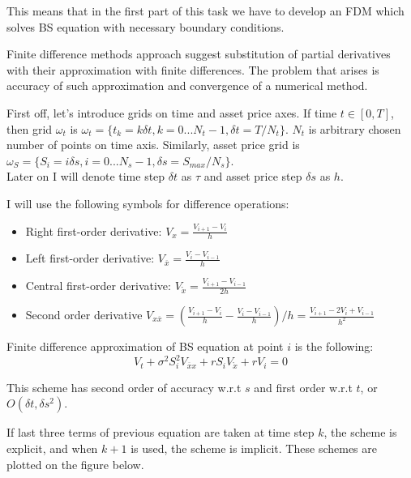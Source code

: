 \documentclass[11pt]{article} %
\begin{document}
This means that in the first part of this task we have to develop an FDM which solves BS equation with necessary boundary conditions. 

Finite difference methods approach suggest substitution of partial derivatives with their approximation with finite differences. The problem that arises is accuracy of such approximation and convergence of a numerical method.

First off, let's introduce grids on time and asset price axes. If time $t \in [0,T]$, then grid $\omega_t$ is $\omega_t = \lbrace t_k = k\delta t, k = 0...N_t-1, \delta t = T/N_t\rbrace$. $N_t$ is arbitrary chosen number of points on time axis. Similarly, asset price grid is $\omega_S = \lbrace S_i = i\delta s, i = 0...N_s-1, \delta s = S_{max}/N_s\rbrace$.\\

Later on I will denote time step $\delta t$ as $\tau$ and asset price step $\delta s$ as $h$.

I will use the following symbols for difference operations:
\begin{itemize}
	\item Right first-order derivative: $V_x =\frac{V_{i+1}-V_i}{h}$
	\item Left first-order derivative: $V_{\overline{x}} =\frac{V_{i}-V_{i-1}}{h}$
	\item Central first-order derivative: $V_{\mathring{x}} =\frac{V_{i+1}-V_{i-1}}{2h}$
	\item Second order derivative $V_{x\overline{x}} = \left(\frac{V_{i+1}-V_i}{h} - \frac{V_{i}-V_{i-1}}{h}\right)/h = \frac{V_{i+1}-2V_{i}+V_{i-1}}{h^2}$
\end{itemize}

Finite difference approximation of BS equation at point $i$ is the following:
\begin{equation}
V_t + \sigma^2 S_i^2 V_{\overline{x}x} + r S_i V_{\mathring{x}} + rV_i = 0
\end{equation}

This scheme has second order of accuracy w.r.t $s$ and first order w.r.t $t$, or $O(\delta t, \delta s^2)$.

If last three terms of previous equation are taken at time step $k$, the scheme is explicit, and when $k+1$ is used, the scheme is implicit. These schemes are plotted on the figure below.
\end{document}
